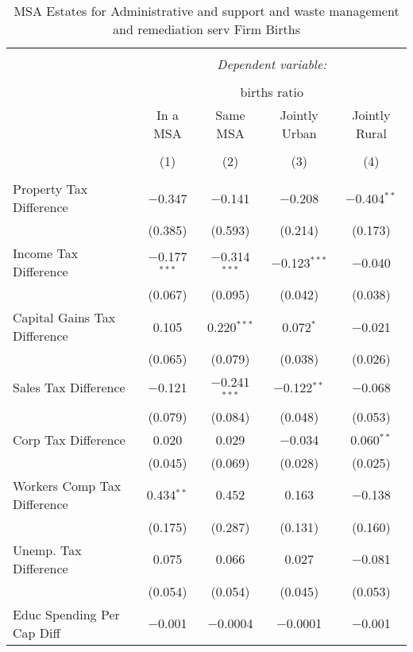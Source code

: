 
\begin{table}[!htbp] \centering 
  \caption{MSA Estates for  Administrative and support and waste management and remediation serv Firm Births} 
  \label{} 
\begin{tabular}{@{\extracolsep{5pt}}lcccc} 
\\[-1.8ex]\hline 
\hline \\[-1.8ex] 
 & \multicolumn{4}{c}{\textit{Dependent variable:}} \\ 
\cline{2-5} 
\\[-1.8ex] & \multicolumn{4}{c}{births ratio} \\ 
 & In a MSA & Same MSA & Jointly Urban & Jointly Rural \\ 
\\[-1.8ex] & (1) & (2) & (3) & (4)\\ 
\hline \\[-1.8ex] 
 Property Tax Difference & $-$0.347 & $-$0.141 & $-$0.208 & $-$0.404$^{**}$ \\ 
  & (0.385) & (0.593) & (0.214) & (0.173) \\ 
  Income Tax Difference & $-$0.177$^{***}$ & $-$0.314$^{***}$ & $-$0.123$^{***}$ & $-$0.040 \\ 
  & (0.067) & (0.095) & (0.042) & (0.038) \\ 
  Capital Gains Tax Difference & 0.105 & 0.220$^{***}$ & 0.072$^{*}$ & $-$0.021 \\ 
  & (0.065) & (0.079) & (0.038) & (0.026) \\ 
  Sales Tax Difference & $-$0.121 & $-$0.241$^{***}$ & $-$0.122$^{**}$ & $-$0.068 \\ 
  & (0.079) & (0.084) & (0.048) & (0.053) \\ 
  Corp Tax Difference & 0.020 & 0.029 & $-$0.034 & 0.060$^{**}$ \\ 
  & (0.045) & (0.069) & (0.028) & (0.025) \\ 
  Workers Comp Tax Difference & 0.434$^{**}$ & 0.452 & 0.163 & $-$0.138 \\ 
  & (0.175) & (0.287) & (0.131) & (0.160) \\ 
  Unemp. Tax Difference & 0.075 & 0.066 & 0.027 & $-$0.081 \\ 
  & (0.054) & (0.054) & (0.045) & (0.053) \\ 
  Educ Spending Per Cap Diff & $-$0.001 & $-$0.0004 & $-$0.0001 & $-$0.001 \\ 

\end{tabular}
\end{table}
